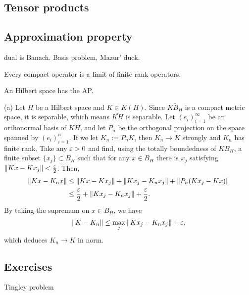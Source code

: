 \documentclass{../../large}
\begin{document}
\section{Tensor products}

\section{Approximation property}
dual is Banach.
Basis problem, Mazur' duck.


\begin{prb}
Every compact operator is a limit of finite-rank operators.
\begin{parts}
\item An Hilbert space has the AP.
\item
\end{parts}
\end{prb}
\begin{pf}
(a)
Let $H$ be a Hilbert space and $K\in K(H)$.
Since $\bar{KB_H}$ is a compact metric space, it is separable, which means $\bar{KH}$ is separable.
Let $(e_i)_{i=1}^\infty$ be an orthonormal basis of $\bar{KH}$, and let $P_n$ be the orthogonal projection on the space spanned by $(e_i)_{i=1}^n$.
If we let $K_n:=P_nK$, then $K_n\to K$ strongly and $K_n$ has finite rank.
Take any $\varepsilon>0$ and find, using the totally boundedness of $KB_H$, a finite subset $\{x_j\}\subset B_H$ such that for any $x\in B_H$ there is $x_j$ satisfying $\|Kx-Kx_j\|<\frac{\varepsilon}2$.
Then,
\begin{align*}
\|Kx-K_nx\|
&\le\|Kx-Kx_j\|+\|Kx_j-K_nx_j\|+\|P_n(Kx_j-Kx)\|\\
&\le\frac{\varepsilon}2+\|Kx_j-K_nx_j\|+\frac{\varepsilon}2.
\end{align*}
By taking the supremum on $x\in B_H$, we have
\[\|K-K_n\|\le\max_j\|Kx_j-K_nx_j\|+\varepsilon,\]
which deduces $K_n\to K$ in norm.

\end{pf}

\section*{Exercises}
Tingley problem



\chapter{}
\end{document}
